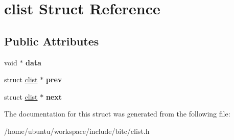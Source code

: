 \hypertarget{structclist}{\section{clist Struct Reference}
\label{structclist}
}
\subsection*{Public Attributes}
\begin{DoxyCompactItemize}
\item 
\hypertarget{structclist_adef29b0cc7e571800ffff37413d614a0}{void $\ast$ {\bfseries data}}\label{structclist_adef29b0cc7e571800ffff37413d614a0}

\item 
\hypertarget{structclist_a1874d4993135e0158648cd60628d5201}{struct \hyperlink{structclist}{clist} $\ast$ {\bfseries prev}}\label{structclist_a1874d4993135e0158648cd60628d5201}

\item 
\hypertarget{structclist_adef7ebb8bca9f90b406a3639cbb80223}{struct \hyperlink{structclist}{clist} $\ast$ {\bfseries next}}\label{structclist_adef7ebb8bca9f90b406a3639cbb80223}

\end{DoxyCompactItemize}


The documentation for this struct was generated from the following file\-:\begin{DoxyCompactItemize}
\item 
/home/ubuntu/workspace/include/bitc/clist.\-h\end{DoxyCompactItemize}
